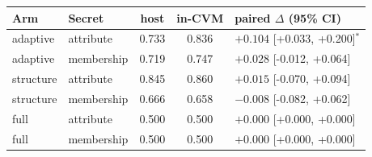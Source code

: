 {\setlength{\tabcolsep}{4pt}\renewcommand{\arraystretch}{1.15}
\begin{tabular}{@{}llccl@{}}
\toprule
Arm & Secret & host & in-CVM & paired $\Delta$ (95\% CI) \\
\midrule
adaptive & attribute & 0.733 & 0.836 & $+0.104$ [+0.033, +0.200]$^{*}$ \\
adaptive & membership & 0.719 & 0.747 & $+0.028$ [-0.012, +0.064] \\
structure & attribute & 0.845 & 0.860 & $+0.015$ [-0.070, +0.094] \\
structure & membership & 0.666 & 0.658 & $-0.008$ [-0.082, +0.062] \\
full & attribute & 0.500 & 0.500 & $+0.000$ [+0.000, +0.000] \\
full & membership & 0.500 & 0.500 & $+0.000$ [+0.000, +0.000] \\
\bottomrule
\end{tabular}}

